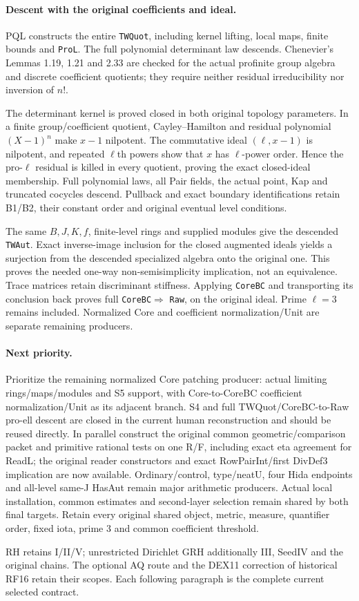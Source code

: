 \paragraph{Descent with the original coefficients and ideal.}
PQL constructs the entire \texttt{TWQuot}, including kernel
lifting, local maps, finite bounds and \texttt{ProL}. The full
polynomial determinant law descends. Chenevier's Lemmas 1.19,
1.21 and 2.33 are checked for the actual profinite group algebra
and discrete coefficient quotients; they require neither
residual irreducibility nor inversion of $n!$.

The determinant kernel is proved closed in both original
topology parameters. In a finite group/coefficient quotient,
Cayley--Hamilton and residual polynomial $(X-1)^n$ make
$x-1$ nilpotent. The commutative ideal $(\ell,x-1)$ is
nilpotent, and repeated $\ell$th powers show that $x$ has
$\ell$-power order. Hence the pro-$\ell$ residual is killed
in every quotient, proving the exact closed-ideal membership.
Full polynomial laws, all Pair fields, the actual point,
Kap and truncated cocycles descend. Pullback and exact
boundary identifications retain B1/B2, their constant order
and original eventual level conditions.

The same $B,J,K,f$, finite-level rings and supplied modules
give the descended \texttt{TWAut}. Exact inverse-image
inclusion for the closed augmented ideals yields a surjection
from the descended specialized algebra onto the original one.
This proves the needed one-way non-semisimplicity implication,
not an equivalence. Trace matrices retain discriminant
stiffness. Applying \texttt{CoreBC} and transporting its
conclusion back proves full \texttt{CoreBC}$\Rightarrow$
\texttt{Raw}, on the original ideal. Prime $\ell=3$ remains
included. Normalized Core and coefficient normalization/Unit
are separate remaining producers.

\paragraph{Next priority.}
Prioritize the remaining normalized Core patching producer: actual limiting rings/\allowbreak{}maps/\allowbreak{}modules and S5 support, with Core-to-CoreBC coefficient normalization/\allowbreak{}Unit as its adjacent branch. S4 and full TWQuot/\allowbreak{}CoreBC-to-Raw pro-ell descent are closed in the current human reconstruction and should be reused directly. In parallel construct the original common geometric/\allowbreak{}comparison packet and primitive rational tests on one R/\allowbreak{}F, including exact eta agreement for ReadL; the original reader constructors and exact RowPairInt/\allowbreak{}first DivDef3 implication are now available. Ordinary/\allowbreak{}control, type/\allowbreak{}neatU, four Hida endpoints and all-level same-J HasAut remain major arithmetic producers. Actual local installation, common estimates and second-layer selection remain shared by both final targets. Retain every original shared object, metric, measure, quantifier order, fixed iota, prime 3 and common coefficient threshold.

RH retains I/II/V; unrestricted Dirichlet GRH additionally III,
SeedIV and the original chains. The optional AQ route and the
DEX11 correction of historical RF16 retain their scopes.
Each following paragraph is the complete current selected contract.
